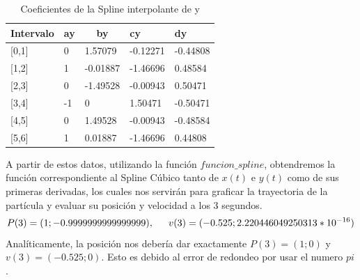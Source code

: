\documentclass{article}
\begin{document}
    \begin{table}[h]
        \centering
        \begin{tabular}{|l|l|l|l|l|}
            \hline
            \multicolumn{1}{|c|}{\textbf{Intervalo}} & \multicolumn{1}{c|}{\textbf{ay}} & \multicolumn{1}{c|}{\textbf{by}} & \textbf{cy} & \textbf{dy} \\ \hline
            {[}0,1{]}                                & 0                                  & 1.57079                            & -0.12271      & -0.44808      \\ \hline
            {[}1,2{]}                                & 1                                  & -0.01887                           & -1.46696      & 0.48584       \\ \hline
            {[}2,3{]}                                & 0                                  & -1.49528                           & -0.00943      & 0.50471       \\ \hline
            {[}3,4{]}                                & -1                                 & 0                                  & 1.50471       & -0.50471      \\ \hline
            {[}4,5{]}                                & 0                                  & 1.49528                            & -0.00943      & -0.48584      \\ \hline
            {[}5,6{]}                                & 1                                  & 0.01887                            & -1.46696      & 0.44808       \\ \hline
        \end{tabular}
        \caption{Coeficientes de la Spline interpolante de y}
        \label{Tabla}
    \end{table}

    \indent A partir de estos datos, utilizando la función \(funcion\_spline\), obtendremos la función correspondiente al Spline Cúbico tanto de \(x(t)\) e \(y(t)\) como de sus primeras derivadas, los cuales nos servirán para graficar la trayectoria de la partícula y evaluar su posición y velocidad a los 3 segundos.
    \begin{equation*}
        P(3) = (1; -0.9999999999999999), \\
        \indent v(3) = (-0.525; 2.220446049250313*10^{-16})
    \end{equation*}
    \indent Analíticamente, la posición nos debería dar exactamente \(P(3)=(1;0)\) y \(v(3)=(-0.525;0)\). Esto es debido al error de redondeo por usar el numero \(pi\).\\\\
    
\end{document}
